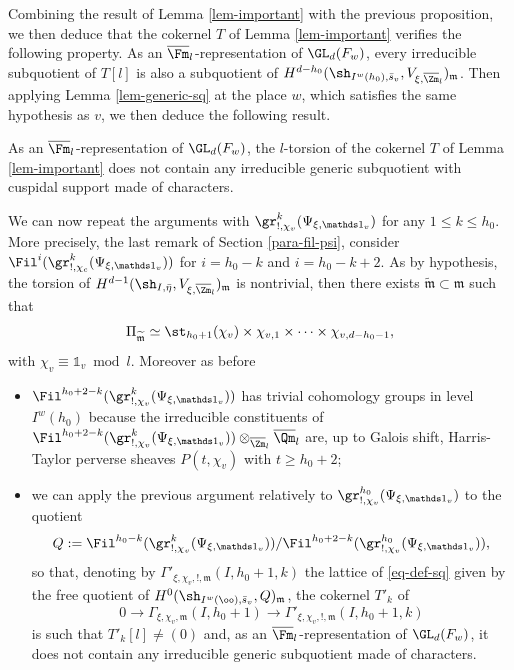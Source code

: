 Combining the result of Lemma \ref{lem-important} with the previous
proposition, we then deduce that the cokernel $T$ of Lemma \ref{lem-important} verifies
the following property. As an $\overline \Fm_l$\nobreakdash-representation of $\GL_d(F_w)$, every irreducible
subquotient of $T[l]$ is also a subquotient of
$H^{d-h_0}(\sh_{I^w(h_0),\bar s_v},V_{\xi,\overline \Zm_l})_{\mathfrak m}$.
Then applying Lemma \ref{lem-generic-sq} at the place $w$, which satisfies the same hypothesis as $v$, we then deduce the following result.

\begin{corol} \label{coro-absurd}
As an $\overline \Fm_l$-representation of $\GL_d(F_w)$, the $l$-torsion of
the cokernel $T$ of Lemma \ref{lem-important}
does not contain any irreducible generic subquotient with cuspidal support made of characters.
\end{corol}

We can now repeat the arguments with $\gr^k_{!,\chi_v}(\Psi_{\xi,\mathds 1_v})$
for any $1 \leq k \leq h_0$. More precisely, \cf the last remark of Section \ref{para-fil-psi},
consider $\Fil^{i}(\gr^{k}_{!,\chi_c}(\Psi_{\xi,\mathds 1_v}))$
for $i=h_0-k$ and $i=h_0-k+2$. As by hypothesis, the torsion of
$H^{d-1}(\sh_{I,\bar \eta},V_{\xi,\overline \Zm_l})_{\mathfrak m}$
is nontrivial, then there exists $\widetilde{\mathfrak m} \subset \mathfrak m$ such that
\[
\Pi_{\widetilde{\mathfrak m}} \simeq
\st_{h_0+1}(\chi_v) \times \chi_{v,1} \times \cdots \times \chi_{v,d-h_0-1},
\]
with $\chi_v \equiv \mathds 1_v \bmod l$.
Moreover as before
\begin{itemize}
\item $\Fil^{h_0+2-k}(\gr^{k}_{!,\chi_v}(\Psi_{\xi,\mathds 1_v}))$
has trivial cohomology groups in level $I^w(h_0)$ because
the irreducible constituents of
$\Fil^{h_0+2-k}(\gr^{k}_{!,\chi_v}(\Psi_{\xi,\mathds 1_v}))
\otimes_{\overline \Zm_l} \overline \Qm_l$ are, up to Galois shift,
Harris-Taylor perverse
sheaves $P(t,\chi_v)$ with $t \geq h_0+2$;

\item we can apply the previous argument relatively to
$\gr^{h_0}_{!,\chi_v}(\Psi_{\xi,\mathds 1_v})$ to the
quotient
\[
Q:=\Fil^{h_0-k}(\gr^{k}_{!,\chi_v}(\Psi_{\xi,\mathds 1_v}))
/\Fil^{h_0+2-k}(\gr^{h_0}_{!,\chi_v}(\Psi_{\xi,\mathds 1_v})),
\]
so that, denoting by
$\Gamma'_{\xi,\chi_v,!,\mathfrak m} (I,h_0+1,k)$
the lattice of \eqref{eq-def-sq} given by the free quotient of
$H^0(\sh_{I^w(\oo),\bar s_v},Q)_{\mathfrak m}$, the cokernel $T'_k$ of
\[
0 \to \Gamma_{\xi,\chi_v,\mathfrak m}(I,h_0+1)
\to \Gamma'_{\xi,\chi_v,!,\mathfrak m}
(I,h_0+1,k)
\]
is such that $T'_k[l] \neq (0)$ and, as an $\overline \Fm_l$-representation of
$\GL_d(F_w)$, it does not contain any irreducible generic subquotient made of
characters.
\end{itemize}

